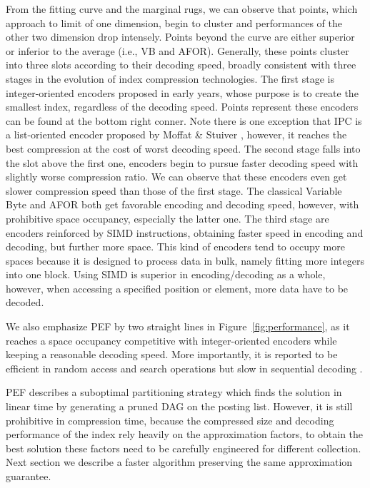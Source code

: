 \documentclass[runningheads]{comsis2}
\begin{document}
From the fitting curve and the marginal rugs, we can observe that points, which approach to limit of one dimension, begin to cluster and performances of the other two dimension drop intensely.
Points beyond the curve are either superior or inferior to the average (i.e., VB and AFOR).
Generally, these points cluster into three slots according to their decoding speed, broadly consistent with three stages in the evolution of index compression technologies.
The first stage is integer-oriented encoders proposed in early years, whose purpose is to create the smallest index, regardless of the decoding speed.
Points represent these encoders can be found at the bottom right conner.
Note there is one exception that IPC is a list-oriented encoder proposed by Moffat \& Stuiver \cite{moffat2000binary}, however, it reaches the best compression at the cost of worst decoding speed.
The second stage falls into the slot above the first one, encoders begin to pursue faster decoding speed with slightly worse compression ratio.
We can observe that these encoders even get slower compression speed than those of the first stage.
The classical Variable Byte and AFOR both get favorable encoding and decoding speed, however, with prohibitive space occupancy, especially the latter one.
The third stage are encoders reinforced by SIMD instructions, obtaining faster speed in encoding and decoding, but further more space.
This kind of encoders tend to occupy more spaces because it is designed to process data in bulk, namely fitting more integers into one block.
Using SIMD is superior in encoding/decoding as a whole, however, when accessing a specified position or element, more data have to be decoded.

We also emphasize PEF by two straight lines in Figure~\ref{fig:performance}, as it reaches a space occupancy competitive with integer-oriented encoders while keeping a reasonable decoding speed.
More importantly, it is reported to be efficient in random access and search operations but slow in sequential decoding \cite{ottaviano2015optimal,vigna2013quasi}.

PEF describes a suboptimal partitioning strategy which finds the solution in linear time by generating a pruned DAG on the posting list.
However, it is still prohibitive in compression time, because the compressed size and decoding performance of the index rely heavily on the approximation factors, to obtain the best solution these factors need to be carefully engineered for different collection.
Next section we describe a faster algorithm preserving the same approximation guarantee.
\end{document}
